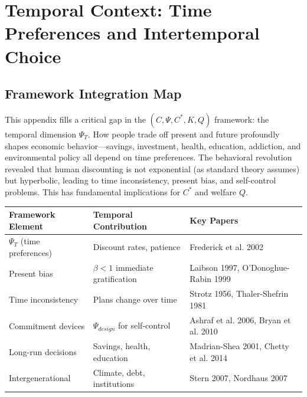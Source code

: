 \section{Temporal Context: Time Preferences and Intertemporal Choice}
\label{app:temporal-context}

\subsection{Framework Integration Map}

This appendix fills a critical gap in the $(C, \Psi, C^*, K, Q)$ framework: 
the temporal dimension $\Psi_T$. How people trade off present and future 
profoundly shapes economic behavior---savings, investment, health, education, 
addiction, and environmental policy all depend on time preferences. The 
behavioral revolution revealed that human discounting is not exponential 
(as standard theory assumes) but hyperbolic, leading to time inconsistency, 
present bias, and self-control problems. This has fundamental implications 
for $C^*$ and welfare $Q$.

\begin{center}
\renewcommand{\arraystretch}{1.4}
\begin{tabular}{|l|l|l|}
\hline
\textbf{Framework Element} & \textbf{Temporal Contribution} & \textbf{Key Papers} \\
\hline
$\Psi_T$ (time preferences) & Discount rates, patience & Frederick et al. 2002 \\
Present bias & $\beta < 1$ immediate gratification & Laibson 1997, O'Donoghue-Rabin 1999 \\
Time inconsistency & Plans change over time & Strotz 1956, Thaler-Shefrin 1981 \\
Commitment devices & $\Psi_{design}$ for self-control & Ashraf et al. 2006, Bryan et al. 2010 \\
Long-run decisions & Savings, health, education & Madrian-Shea 2001, Chetty et al. 2014 \\
Intergenerational & Climate, debt, institutions & Stern 2007, Nordhaus 2007 \\
\hline
\end{tabular}
\end{center}


